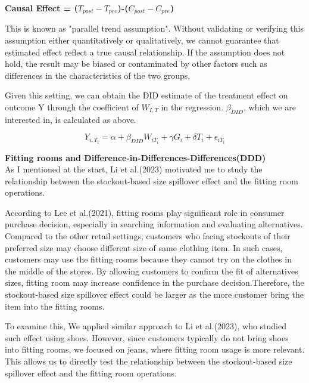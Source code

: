 \documentclass[letterpaper,12pt]{article}
\theoremstyle{definition}
\begin{document}
 \begin{center}
 	\textbf{\large Causal Effect = ($T_{post} - T_{pre}$)-($C_{post} - C_{pre}$)} \\[2mm]
 \end{center}
 
  \cite{Ashesh2023}This is known as "parallel trend assumption". Without validating or verifying this assumption either quantitatively or qualitatively, we cannot guarantee that estimated effect reflect a true causal relationship. If the assumption does not hold, the result may be biased or contaminated by other factors such as differences in the characteristics of the two groups.
  
  \cite{Teck2017}Given this setting, we can obtain the DID estimate of the treatment effect on outcome Y through the coefficient of $W_{I,T}$ in the regression. $\beta_{DID}$, which we are interested in, is calculated as above.

\begin{equation*}
	Y_{i,T_i} = \alpha + \beta_{DID} W_{iT_i} + \gamma G_i + \delta T_i + \epsilon_{iT_i}
\end{equation*}


  
  \textbf{Fitting rooms and Difference-in-Differences-Differences(DDD)}\\[2mm]
  
   As I mentioned at the start, Li et al.(2023) motivated me to study the relationship between the stockout-based size spillover effect and the fitting room operations.
  
  According to Lee et al.(2021)\cite{Lee2021}, fitting rooms play significant role in consumer purchase decision, especially in searching information and evaluating alternatives. Compared to the other retail settings, customers who facing stockouts of their preferred size may choose different size of same clothing item. In such cases, customers may use the fitting rooms because they cannot try on the clothes in the middle of the stores. By allowing customers to confirm the fit of alternatives sizes, fitting room may increase confidence in the purchase decision.Therefore, the stockout-based size spillover effect could be larger as the more customer bring the item into the fitting rooms. 
  
  To examine this, We applied similar approach to Li et al.(2023), who studied such effect using shoes. However, since customers typically do not bring shoes into fitting rooms, we focused on jeans, where fitting room usage is more relevant. This allows us to directly test the relationship between the stockout-based size spillover effect and the fitting room operations.
  
\end{document}
